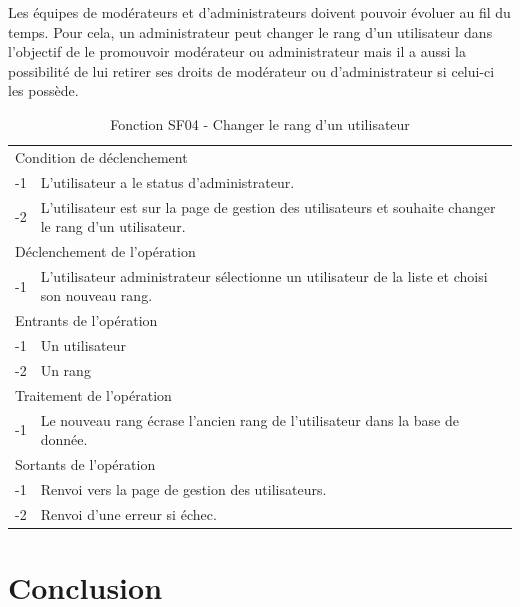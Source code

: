\documentclass[a4paper]{article}
\begin{document}
Les équipes de modérateurs et d'administrateurs doivent pouvoir évoluer au fil du temps. Pour cela, un administrateur peut changer le rang d'un utilisateur dans l'objectif de le promouvoir modérateur ou administrateur mais il a aussi la possibilité de lui retirer ses droits de modérateur ou d'administrateur si celui-ci les possède.

\begin{table}[H]
  \centering
   \small
	\begin{tabular}{|c|p{12cm}|}
   		\hline
   			\rowcolor{lightgray}\multicolumn{2}{|c|}{\textbf{Fonction SF04 - Changer le rang d'un utilisateur}} \\
   		\hline
   			\multicolumn{2}{|l|}{Condition de déclenchement} \\
   		\hline
   			-1 & L'utilisateur a le status d'administrateur.\\
        	-2 & L'utilisateur est sur la page de gestion des utilisateurs et souhaite changer le rang d'un utilisateur.\\
   		\hline
   			\multicolumn{2}{|l|}{Déclenchement de l'opération} \\
   		\hline
   			-1 & L'utilisateur administrateur sélectionne un utilisateur de la liste et choisi son nouveau rang.\\
   		\hline
   			\multicolumn{2}{|l|}{Entrants de l'opération} \\
   		\hline
   			-1 & Un utilisateur\\
            -2 & Un rang\\
   		\hline
   			\multicolumn{2}{|l|}{Traitement de l'opération} \\
  		\hline
   			-1 & Le nouveau rang écrase l'ancien rang de l'utilisateur dans la base de donnée.\\
   		\hline
   			\multicolumn{2}{|l|}{Sortants de l'opération} \\
   		\hline
   			-1 & Renvoi vers la page de gestion des utilisateurs.\\
        	-2 & Renvoi d'une erreur si échec.\\
   		\hline
	\end{tabular}
  \caption{Fonction SF04 - Changer le rang d'un utilisateur}
  \normalsize
  \label{tab: promouvoir_utilisateur}
\end{table}

\newpage
\section*{Conclusion}
\end{document}
